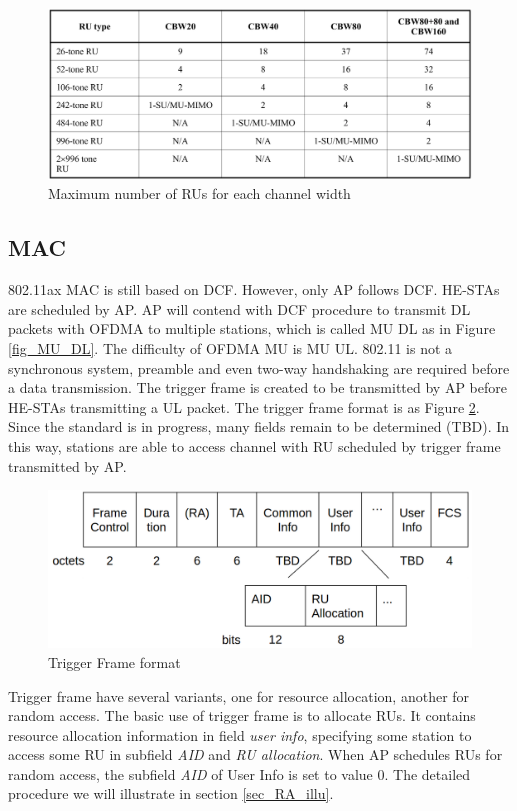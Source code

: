 \begin{figure}[!h]
\centering
\includegraphics[scale=0.23]{./figure/chp2/RU_spec.png}
\caption{Maximum number of RUs for each channel width\cite{draft_ax}}
\label{fig_RU_spec}
\end{figure}


\subsection{MAC}
802.11ax MAC is still based on DCF. However, only AP follows DCF. HE-STAs are scheduled by AP.
AP will contend with DCF procedure to transmit DL packets with OFDMA to multiple stations, which is called MU DL as in Figure \ref{fig_MU_DL}. 
The difficulty of OFDMA MU is MU UL. 
802.11 is not a synchronous system, preamble and even two-way handshaking are required before a data transmission. 
The trigger frame is created to be transmitted by AP before HE-STAs transmitting a UL packet. 
The trigger frame format is as Figure \ref{fig_TF_format}. Since the standard is in progress, many fields remain to be determined (TBD). 
In this way, stations are able to access channel with RU scheduled by trigger frame transmitted by AP. 

\begin{figure}[!b]
\centering
\includegraphics[scale=0.3]{./figure/chp2/fig_tf_format.png}
\caption{Trigger Frame format\cite{draft_ax}}
\label{fig_TF_format}
\end{figure}

Trigger frame have several variants, one for resource allocation, another for random access. 
The basic use of trigger frame is to allocate RUs. It contains resource allocation information in field \textit{user info}, specifying some station to access some RU in subfield \textit{AID} and \textit{RU allocation}.  
When AP schedules RUs for random access, the subfield \textit{AID} of User Info is set to value 0. The detailed procedure we will illustrate in section \ref{sec_RA_illu}. 

